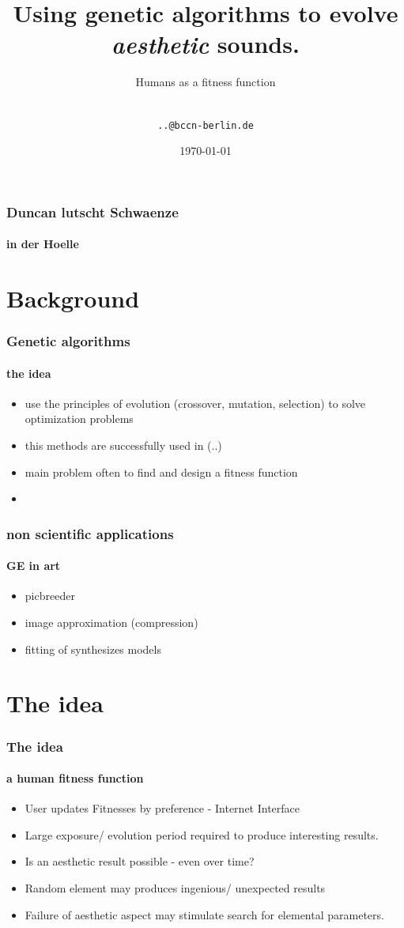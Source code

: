 \documentclass{beamer}
\title[Sound Evolution] {Using genetic algorithms to evolve \emph{aesthetic} sounds.}
\subtitle{Humans as a fitness function}
\author[Duncan, Matthias, Rafael, Mirko \& Stephan] { \\\texttt{..@bccn-berlin.de}}
\date[SS 2010] {\today}
\begin{document}
\frame{\titlepage}

\begin{frame}
	\frametitle{Duncan lutscht Schwaenze}
	\framesubtitle{in der Hoelle}
	
\end{frame}


\section{Background} %
\label{sg:sec:background}

\begin{frame}
	\frametitle{Genetic algorithms}
	\framesubtitle{the idea}
	
	\begin{itemize}
		\item<1-> use the principles of evolution (crossover, mutation, selection)
		to solve optimization problems
		\item<2-> this methods are successfully used in (..) 
		\item<3-> main problem often to find and design a fitness function
		\item<+-> 
	\end{itemize}
\end{frame}

\begin{frame}
	\frametitle{non scientific applications}
	\framesubtitle{GE in art}
	
	\begin{itemize}
		\item<1-> picbreeder
		\item<2-> image approximation (compression)
		\item<3-> fitting of synthesizes models
	\end{itemize}
	
\end{frame}



\section{The idea} %
\label{sg:sec:the_idea}

\begin{frame}
	\frametitle{The idea}
	\framesubtitle{a human fitness function}
	\begin{itemize}
		\item<1-> User updates Fitnesses by preference - Internet Interface
		\item<2-> Large exposure/ evolution period required to produce interesting results.
     	\item<3-> Is an aesthetic result possible - even over time?
        \item<4-> Random element may produces ingenious/ unexpected results
        \item<5-> Failure of aesthetic aspect may stimulate search for elemental parameters.
	\end{itemize}
	
\end{frame}
\end{document}
